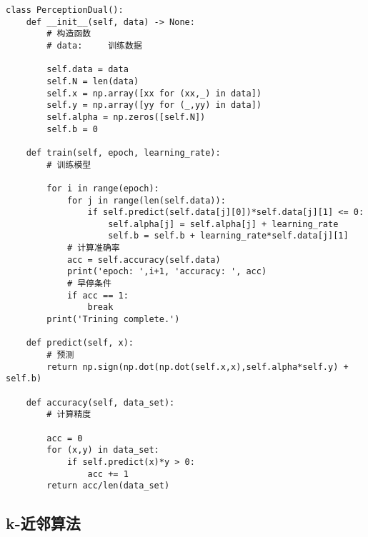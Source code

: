\begin{lstlisting}[caption = 感知机对偶算法实现]
class PerceptionDual():
    def __init__(self, data) -> None:
        # 构造函数
        # data:     训练数据
        
        self.data = data
        self.N = len(data)
        self.x = np.array([xx for (xx,_) in data])
        self.y = np.array([yy for (_,yy) in data])
        self.alpha = np.zeros([self.N])
        self.b = 0
    
    def train(self, epoch, learning_rate):
        # 训练模型
        
        for i in range(epoch):
            for j in range(len(self.data)):
                if self.predict(self.data[j][0])*self.data[j][1] <= 0:
                    self.alpha[j] = self.alpha[j] + learning_rate
                    self.b = self.b + learning_rate*self.data[j][1]
            # 计算准确率
            acc = self.accuracy(self.data)
            print('epoch: ',i+1, 'accuracy: ', acc)
            # 早停条件
            if acc == 1:
                break
        print('Trining complete.')

    def predict(self, x):
        # 预测
        return np.sign(np.dot(np.dot(self.x,x),self.alpha*self.y) + self.b)
    
    def accuracy(self, data_set):
        # 计算精度

        acc = 0
        for (x,y) in data_set:
            if self.predict(x)*y > 0:
                acc += 1
        return acc/len(data_set)
\end{lstlisting}

\subsection{k-近邻算法}

